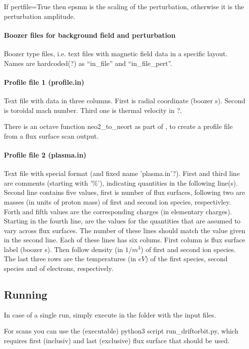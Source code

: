 If pertfile=True then epsmn is the scaling of the perturbation,
otherwise it is the perturbation amplitude.

\paragraph{Boozer files for background field and perturbation}
Boozer type files, i.e. text files with magnetic field data in a
specific layout. Names are hardcoded(?) as ``in_file'' and
``in_file_pert''.

\paragraph{Profile file 1 (profile.in)}
Text file with data in three columns. First is radial coordinate
(boozer s). Second is toroidal mach number. Third one is thermal
velocity in ?.

There is an octave function neo2\_to\_neort as part of \neotwo, to
create a \neort profile file from a \neotwo flux surface scan output.

\paragraph{Profile file 2 (plasma.in)}
Text file with special format (and fixed name 'plasma.in'?). First and
third line are comments (starting with '\%'), indicating quantities in the
following line(s). Second line contains five values, first is number of
flux surfaces, following two are masses (in units of proton mass) of
first and second ion species, respectivley. Forth and fifth values are
the corresponding charges (in elementary charges).
Starting in the fourth line, are the values for the quantities that are
assumed to vary across flux surfaces. The number of these lines should
match the value given in the second line.
Each of these lines has six colums. First column is flux surface label
(boozer s). Then follow density (in $1/m^3$) of first and second ion
species.
The last three rows are the temperatures (in $eV$) of the first species,
second species and of electrons, respectively.

\subsection{Running}
In case of a single run, simply execute \neort in the folder with the
input files.

For scans you can use the (executable) python3 script
run\_driftorbit.py, which requires first (inclusiv) and last (exclusive)
flux surface that should be used.

